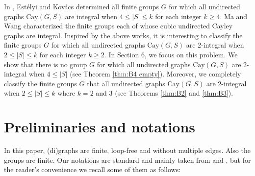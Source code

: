 \documentclass[12pt,a4paper]{article}
\def \leq {\leqslant}
\def \geq {\geqslant}
\begin{document}
	
		In \cite{EK}, Est\'{e}lyi and Kov\'{a}cs determined all finite groups $G$ for which all undirected graphs $\mathrm{Cay}(G, S)$ are integral when $4\leq |S|\leq k$ for each integer $k\geq 4$.
		Ma and Wang \cite{MWkais} characterized the finite groups each of whose cubic undirected Cayley graphs are integral.
		Inspired by the above works, it is interesting to classify the finite groups $G$ for which all undirected graphs $\mathrm{Cay}(G, S)$ are $2$-integral when $2\leq |S|\leq k$ for each integer $k\geq 2$.
		In Section 6, we focus on this problem.
		We show that there is no group $G$ for which all undirected graphs  $\mathrm{Cay}(G, S)$ are $2$-integral when $4\leq |S|$ (see Theorem \ref{thm:B4 empty}).
		Moreover, we completely classify the finite groups $G$ that all undirected graphs $\mathrm{Cay}(G, S)$ are $2$-integral when $2\leq |S|\leq k$ where $k=2$ and $3$ (see Theorems \ref{thm:B2} and \ref{thm:B3}).
		
		
		
	
	\section{Preliminaries and notations}
	
	In this paper, (di)graphs are finite, loop-free and without multiple edges. Also the groups are finite.  Our notations are standard and  mainly taken from \cite{HIK} and \cite{JL}, but for the reader's
	convenience we recall some of them as follows:
	
\end{document}

